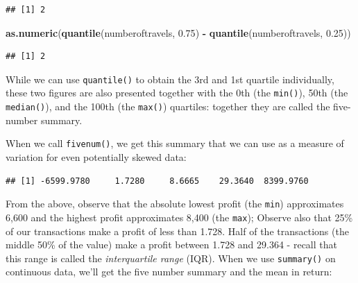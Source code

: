 \documentclass[]{article}
\newenvironment{Shaded}{\begin{snugshade}}{\end{snugshade}}
\newcommand{\FloatTok}[1]{\textcolor[rgb]{0.00,0.00,0.81}{#1}}
\newcommand{\KeywordTok}[1]{\textcolor[rgb]{0.13,0.29,0.53}{\textbf{#1}}}
\newcommand{\NormalTok}[1]{#1}
\newcommand{\OperatorTok}[1]{\textcolor[rgb]{0.81,0.36,0.00}{\textbf{#1}}}
\newcommand{\StringTok}[1]{\textcolor[rgb]{0.31,0.60,0.02}{#1}}
\begin{document}
\begin{verbatim}
## [1] 2
\end{verbatim}

\begin{Shaded}
\begin{Highlighting}[]
\KeywordTok{as.numeric}\NormalTok{(}\KeywordTok{quantile}\NormalTok{(numberoftravels, }\FloatTok{0.75}\NormalTok{) }\OperatorTok{-}\StringTok{ }\KeywordTok{quantile}\NormalTok{(numberoftravels, }\FloatTok{0.25}\NormalTok{))}
\end{Highlighting}
\end{Shaded}

\begin{verbatim}
## [1] 2
\end{verbatim}

While we can use \texttt{quantile()} to obtain the 3rd and 1st quartile
individually, these two figures are also presented together with the 0th
(the \texttt{min()}), 50th (the \texttt{median()}), and the 100th (the
\texttt{max()}) quartiles: together they are called the five-number
summary.

When we call \texttt{fivenum()}, we get this summary that we can use as
a measure of variation for even potentially skewed data:

\begin{Shaded}
\end{Shaded}

\begin{verbatim}
## [1] -6599.9780     1.7280     8.6665    29.3640  8399.9760
\end{verbatim}

From the above, observe that the absolute lowest profit (the
\texttt{min}) approximates 6,600 and the highest profit approximates
8,400 (the \texttt{max}); Observe also that 25\% of our transactions
make a profit of less than 1.728. Half of the transactions (the middle
50\% of the value) make a profit between 1.728 and 29.364 - recall that
this range is called the \emph{interquartile range} (IQR). When we use
\texttt{summary()} on continuous data, we'll get the five number summary
and the mean in return:

\begin{Shaded}
\end{Shaded}
\end{document}
